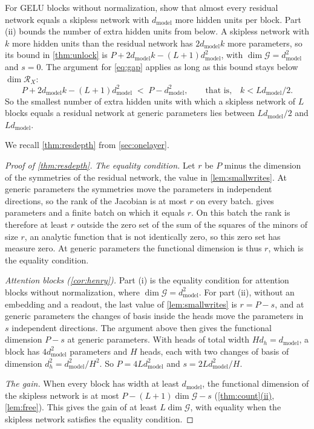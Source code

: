 \documentclass[10pt]{article}
\theoremstyle{definition}
\theoremstyle{remark}
\newcommand{\dm}{d_{\mathrm{model}}}
\newcommand{\G}{\mathcal{G}}
\DeclareRobustCommand{\cpref}[2]{\hyperref[#1:#2]{\cref*{#1}(#2)}}
\begin{document}
For GELU blocks without normalization, \citet{mijoski2026worth} show that almost every residual network equals a skipless network with $\dm$ more hidden units per block. Part (ii) bounds the number of extra hidden units from below. A skipless network with $k$ more hidden units than the residual network has $2\dm k$ more parameters, so its bound in \cref{thm:unlock} is $P + 2\dm k - (L+1)\dm^2$, with $\dim\G = \dm^2$ and $s = 0$. The argument for \eqref{eq:gap} applies as long as this bound stays below $\dim\mathcal R_X$:
\begin{equation}\label{eq:extra}
P + 2\dm k - (L+1)\dm^2 \;<\; P - \dm^2, \qquad\text{that is,}\quad k < L\dm/2.
\end{equation}
So the smallest number of extra hidden units with which a skipless network of $L$ blocks equals a residual network at generic parameters lies between $L\dm/2$ and $L\dm$.

We recall \cref{thm:resdepth} from \cref{sec:onelayer}.
\thmResDepth*

\begin{proof}[Proof of \cref{thm:resdepth}]
\emph{The equality condition.} Let $r$ be $P$ minus the dimension of the symmetries of the residual network, the value in \cref{lem:smallwrites}. At generic parameters the symmetries move the parameters in independent directions, so the rank of the Jacobian is at most $r$ on every batch.  gives parameters and a finite batch on which it equals $r$. On this batch the rank is therefore at least $r$ outside the zero set of the sum of the squares of the minors of size $r$, an analytic function that is not identically zero, so this zero set has measure zero. At generic parameters the functional dimension is thus $r$, which is the equality condition.

\emph{Attention blocks (\cref{cor:henry}).} Part (i) is the equality condition for attention blocks without normalization, where $\dim\G = \dm^2$. For part (ii), without an embedding and a readout, the last value of \cref{lem:smallwrites} is $r = P - s$, and at generic parameters the changes of basis inside the heads move the parameters in $s$ independent directions. The argument above then gives the functional dimension $P - s$ at generic parameters. With heads of total width $Hd_h = \dm$, a block has $4\dm^2$ parameters and $H$ heads, each with two changes of basis of dimension $d_h^2 = \dm^2/H^2$. So $P = 4L\dm^2$ and $s = 2L\dm^2/H$.

\emph{The gain.} When every block has width at least $\dm$, the functional dimension of the skipless network is at most $P - (L+1)\dim\G - s$ (\cpref{thm:count}{ii}, \cref{lem:free}). This gives the gain of at least $L\dim\G$, with equality when the skipless network satisfies the equality condition.
\end{proof}
\end{document}
